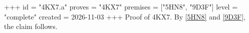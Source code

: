 +++
id = "4KX7.a"
proves = "4KX7"
premises = ["5HN8", "9D3F"]
level = "complete"
created = 2026-11-03
+++
Proof of 4KX7. By \ref{5HN8} and \ref{9D3F}, the claim follows.
